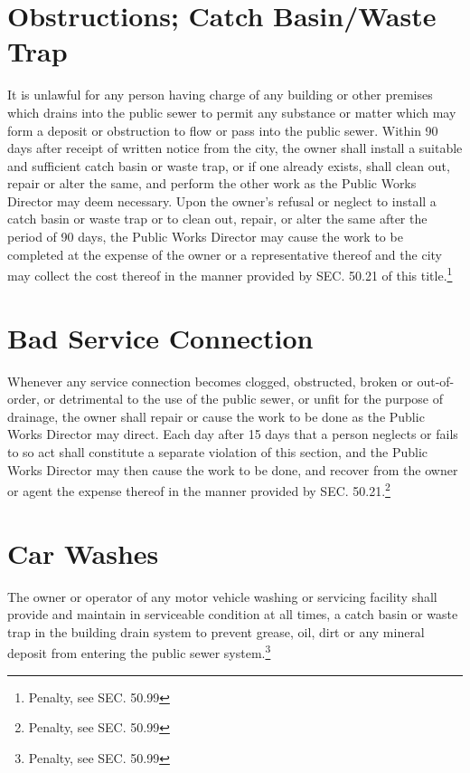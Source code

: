 \section{Obstructions; Catch Basin/Waste Trap}
It is unlawful for any person having charge of any building or other premises which drains into the public sewer to permit any substance or matter which may form a deposit or obstruction to flow or pass into the public sewer.  Within 90 days after receipt of written notice from the city, the owner shall install a suitable and sufficient catch basin or waste trap, or if one already exists, shall clean out, repair or alter the same, and perform the other work as the Public Works Director may deem necessary.  Upon the owner’s refusal or neglect to install a catch basin or waste trap or to clean out, repair, or alter the same after the period of 90 days, the Public Works Director may cause the work to be completed at the expense of the owner or a representative thereof and the city may collect the cost thereof in the manner provided by SEC. 50.21 of this title.\footnote{Penalty, see SEC. 50.99}

\section{Bad Service Connection}
Whenever any service connection becomes clogged, obstructed, broken or out-of-order, or detrimental to the use of the public sewer, or unfit for the purpose of drainage, the owner shall repair or cause the work to be done as the Public Works Director may direct.  Each day after 15 days that a person neglects or fails to so act shall constitute a separate violation of this section, and the Public Works Director may then cause the work to be done, and recover from the owner or agent the expense thereof in the manner provided by SEC. 50.21.\footnote{Penalty, see SEC. 50.99}

\section{Car Washes}
The owner or operator of any motor vehicle washing or servicing facility shall provide and maintain in serviceable condition at all times, a catch basin or waste trap in the building drain system to prevent grease, oil, dirt or any mineral deposit from entering the public sewer system.\footnote{Penalty, see SEC. 50.99}


